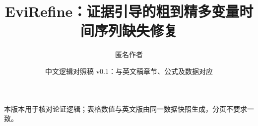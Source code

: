 \documentclass[UTF8,11pt,a4paper,fontset=fandol]{ctexart}
\title{EviRefine：证据引导的粗到精多变量时间序列缺失修复}
\author{匿名作者}
\date{中文逻辑对照稿 v0.1：与英文稿章节、公式及数据对应}
\begin{document}
\maketitle
\noindent{}本版本用于核对论证逻辑；表格数值与英文版由同一数据快照生成，分页不要求一致。






\FloatBarrier


{\small}
\end{document}
